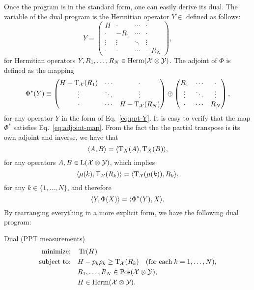 Once the program is in the standard form, one can easily derive its dual.
The variable of the dual program is the Hermitian operator
$Y \in $ 
defined as follows:
\begin{equation}
\label{eq:ppt-Y}
  Y = 
  \begin{pmatrix}
      H & \cdot & \cdots & \cdot \\
        \cdot  & -R_{1} & \cdots & \cdot\\
        \vdots & \vdots & \ddots & \vdots\\
        \cdot  & \cdot & \cdots & -R_{N}
    \end{pmatrix},
\end{equation}
for Hermitian operators $Y, R_{1}, \ldots, R_{N} \in \mathrm{Herm}(\mathcal{X}\otimes\mathcal{Y})$.
The adjoint of $\Phi$ is defined as the mapping
\begin{equation}
  \Phi^{\ast}(Y) \equiv 
    \begin{pmatrix}
      H - \operatorname{T}_{\mathcal{X}}(R_{1}) & \cdots & \cdot\\
      \vdots & \ddots & \vdots\\
      \cdot & \cdots & H - \operatorname{T}_{\mathcal{X}}(R_{N})\\
    \end{pmatrix}
    \oplus
    \begin{pmatrix}
      R_{1} & \cdots & \cdot\\
      \vdots & \ddots & \vdots\\
      \cdot & \cdots & R_{N}\\
    \end{pmatrix},
\end{equation}
for any operator $Y$ in the form of Eq.~\eqref{eq:ppt-Y}.
It is easy to verify that the map $\Phi^{\ast}$ satisfies Eq.~\eqref{eq:adjoint-map}.
From the fact the the partial transpose is its own adjoint and inverse, we have 
that
\begin{equation}
  \langle A , B\rangle = \langle \operatorname{T}_{X}(A) , \operatorname{T}_{X}(B)\rangle,
\end{equation}
for any operators $A, B\in\mathrm{L}(\mathcal{X}\otimes\mathcal{Y})$, which implies
\begin{equation}
\langle \mu(k) , \operatorname{T}_{\mathcal{X}}(R_{k})\rangle = \langle \operatorname{T}_{\mathcal{X}}(\mu(k)) , R_{k}\rangle,
\end{equation}
for any $k \in \{1, \ldots, N\}$, and therefore
\begin{equation}
  \langle Y , \Phi(X)\rangle = \langle \Phi^{\ast}(Y) , X\rangle.
\end{equation}
By rearranging everything in a more explicit form, we have the following dual program:
\begin{center}
\underline{Dual (PPT measurements)}
\begin{equation}
  \label{eq:ppt-dual-problem}
  \begin{split}
    \text{minimize:} \quad & \operatorname{Tr}(H)\\
    \text{subject to:} \quad & H-p_k\rho_k \geq \operatorname{T}_{\mathcal{X}}(R_{k})
    \quad(\text{for each}\;k = 1,\ldots,N),\\
    \quad & R_{1}, \ldots, R_{N} \in \mathrm{Pos}(\mathcal{X}\otimes\mathcal{Y}),\\
    \quad & H \in \mathrm{Herm}(\mathcal{X}\otimes\mathcal{Y}).
  \end{split}
\end{equation}
\end{center}

